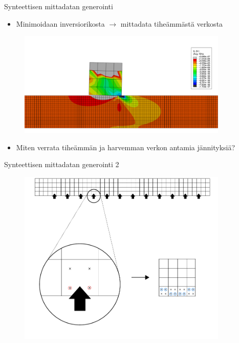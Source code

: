\documentclass{beamer}
\begin{document}
\begin{frame}{Synteettisen mittadatan generointi}

\begin{itemize}
\item Minimoidaan inversiorikosta $\rightarrow$ mittadata tiheämmästä verkosta
\end{itemize}

\begin{figure}
\includegraphics[width=10cm]{finer_mesh.pdf}
\end{figure}

\begin{itemize}
\item Miten verrata tiheämmän ja harvemman verkon antamia jännityksiä?
\end{itemize}

\end{frame}

\begin{frame}{Synteettisen mittadatan generointi 2}

\begin{figure}
\includegraphics[width=10cm]{fretting_meas_tarkempi.pdf}
\end{figure}

\end{frame}
\end{document}
